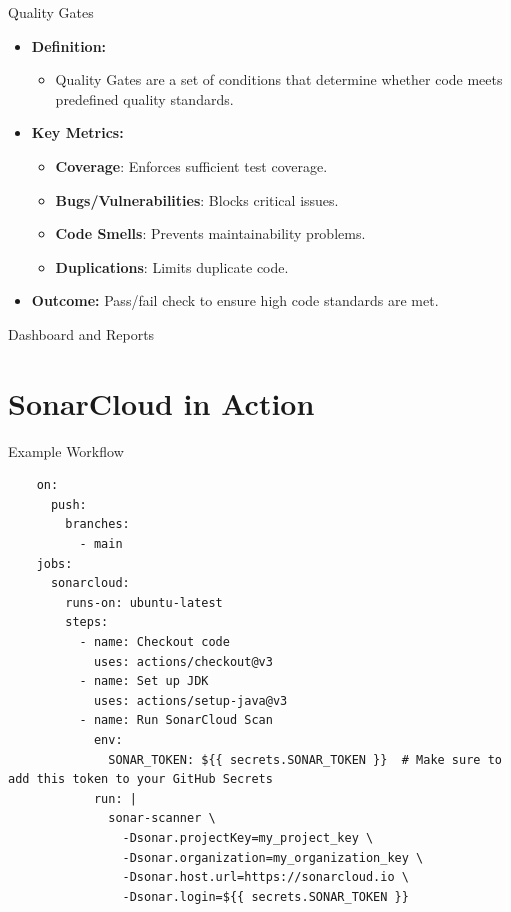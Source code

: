 \documentclass{beamer}
\begin{document}
\begin{frame}{Quality Gates}
  \begin{itemize}
    \item \textbf{Definition:}
    \begin{itemize}
      \item Quality Gates are a set of conditions that determine whether code meets predefined quality standards.
    \end{itemize}

    \vspace*{1em}

    \item \textbf{Key Metrics:}
    \begin{itemize}
        \item \textbf{Coverage}: Enforces sufficient test coverage.
        \item \textbf{Bugs/Vulnerabilities}: Blocks critical issues.
        \item \textbf{Code Smells}: Prevents maintainability problems.
        \item \textbf{Duplications}: Limits duplicate code.
    \end{itemize}
    
    \vspace*{1em}

    \item \textbf{Outcome:}
    Pass/fail check to ensure high code standards are met.
  \end{itemize}
\end{frame}

\begin{frame}{Dashboard and Reports}
 
\end{frame}


\section[SonarCloud in Action]{SonarCloud in Action}

\begin{frame}[fragile]{Example Workflow}

  \begin{verbatim}
    on:
      push:
        branches:
          - main
    jobs:
      sonarcloud:
        runs-on: ubuntu-latest
        steps:
          - name: Checkout code
            uses: actions/checkout@v3
          - name: Set up JDK
            uses: actions/setup-java@v3
          - name: Run SonarCloud Scan
            env:
              SONAR_TOKEN: ${{ secrets.SONAR_TOKEN }}  # Make sure to add this token to your GitHub Secrets
            run: |
              sonar-scanner \
                -Dsonar.projectKey=my_project_key \
                -Dsonar.organization=my_organization_key \
                -Dsonar.host.url=https://sonarcloud.io \
                -Dsonar.login=${{ secrets.SONAR_TOKEN }}
  \end{verbatim}

\end{frame}
\end{document}
